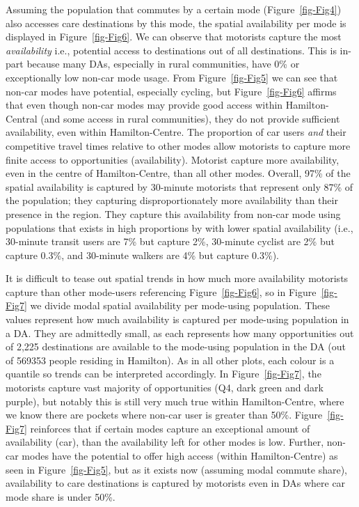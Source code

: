 \documentclass[
  super,
  preprint,
  3p]{elsarticle}
\begin{document}
Assuming the population that commutes by a certain mode
(Figure~\ref{fig-Fig4}) also accesses care destinations by this mode,
the spatial availability per mode is displayed in Figure~\ref{fig-Fig6}.
We can observe that motorists capture the most \emph{availability} i.e.,
potential access to destinations out of all destinations. This is
in-part because many DAs, especially in rural communities, have 0\% or
exceptionally low non-car mode usage. From Figure~\ref{fig-Fig5} we can
see that non-car modes have potential, especially cycling, but
Figure~\ref{fig-Fig6} affirms that even though non-car modes may provide
good access within Hamilton-Central (and some access in rural
communities), they do not provide sufficient availability, even within
Hamilton-Centre. The proportion of car users \emph{and} their
competitive travel times relative to other modes allow motorists to
capture more finite access to opportunities (availability). Motorist
capture more availability, even in the centre of Hamilton-Centre, than
all other modes. Overall, 97\% of the spatial availability is captured
by 30-minute motorists that represent only 87\% of the population; they
capturing disproportionately more availability than their presence in
the region. They capture this availability from non-car mode using
populations that exists in high proportions by with lower spatial
availability (i.e., 30-minute transit users are 7\% but capture 2\%,
30-minute cyclist are 2\% but capture 0.3\%, and 30-minute walkers are
4\% but capture 0.3\%).

It is difficult to tease out spatial trends in how much more
availability motorists capture than other mode-users referencing
Figure~\ref{fig-Fig6}, so in Figure~\ref{fig-Fig7} we divide modal
spatial availability per mode-using population. These values represent
how much availability is captured per mode-using population in a DA.
They are admittedly small, as each represents how many opportunities out
of 2,225 destinations are available to the mode-using population in the
DA (out of 569353 people residing in Hamilton). As in all other plots,
each colour is a quantile so trends can be interpreted accordingly. In
Figure~\ref{fig-Fig7}, the motorists capture vast majority of
opportunities (Q4, dark green and dark purple), but notably this is
still very much true within Hamilton-Centre, where we know there are
pockets where non-car user is greater than 50\%. Figure~\ref{fig-Fig7}
reinforces that if certain modes capture an exceptional amount of
availability (car), than the availability left for other modes is low.
Further, non-car modes have the potential to offer high access (within
Hamilton-Centre) as seen in Figure~\ref{fig-Fig5}, but as it exists now
(assuming modal commute share), availability to care destinations is
captured by motorists even in DAs where car mode share is under 50\%.
\end{document}
